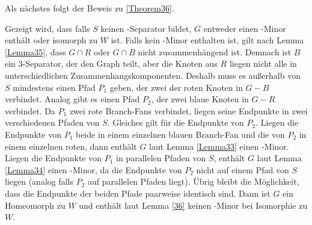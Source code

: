 Als nächstes folgt der Beweis zu \ref{Theorem36}.
\begin{beweis}
  Gezeigt wird, dass falls $S$ keinen \dd-Separator bildet, $G$ entweder einen \kf-Minor enthält oder isomorph zu $W$ ist.
  Falls kein \kf-Minor enthalten ist, gilt nach Lemma \ref{Lemma35}, dass $G \cap R$ oder $G \cap B$ nicht zusammenhängend ist.
  Demnach ist $B$ ein $3$-Separator, der den Graph teilt, aber die Knoten aus $R$ liegen nicht alle in unterschiedlichen Zusammenhangskomponenten.
  Deshalb muss es außerhalb von $S$ mindestens einen Pfad $P_1$ geben, der zwei der roten Knoten in $G - B$ verbindet.
  Analog gibt es einen Pfad $P_2$, der zwei blaue Knoten in $G - R$ verbindet.
  Da $P_1$ zwei rote Branch-Fans verbindet, liegen seine Endpunkte in zwei verschiedenen Pfaden von $S$.
  Gleiches gilt für die Endpunkte von $P_2$.
  Liegen die Endpunkte von $P_1$ beide in einem einzelnen blauen Branch-Fan und die von $P_2$ in einem einzelnen roten, dann enthält $G$ laut Lemma \ref{Lemma33} einen \kf-Minor.
  Liegen die Endpunkte von $P_1$ in parallelen Pfaden von $S$, enthält $G$ laut Lemma \ref{Lemma34} einen \kf-Minor, da die Endpunkte von $P_2$ nicht auf einem Pfad von $S$ liegen (analog falls $P_2$ auf parallelen Pfaden liegt).
  Übrig bleibt die Möglichkeit, dass die Endpunkte der beiden Pfade paarweise identisch sind.
  Dann ist $G$ ein Homeomorph zu $W$ und enthält laut Lemma \ref{36} keinen \kf-Minor bei Isomorphie zu $W$.
\end{beweis}
